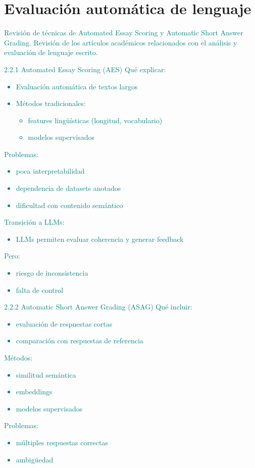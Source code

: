 \section{Evaluación automática de lenguaje}
\textcolor{teal}{Revisión de técnicas de Automated Essay Scoring y Automatic Short Answer Grading. Revisión de los artículos académicos relacionados con el análisis y evaluación de lenguaje escrito.}

\textcolor{teal}{
    2.2.1 Automated Essay Scoring (AES)
    Qué explicar:
    \begin{itemize}
        \item Evaluación automática de textos largos
        \item Métodos tradicionales:
        \begin{itemize}
            \item features lingüísticas (longitud, vocabulario)
            \item modelos supervisados            
        \end{itemize}
    \end{itemize}
    Problemas:
    \begin{itemize}
        \item poca interpretabilidad
        \item dependencia de datasets anotados
        \item dificultad con contenido semántico
    \end{itemize}
    Transición a LLMs:
    \begin{itemize}
        \item LLMs permiten evaluar coherencia y generar feedback
    \end{itemize}
    Pero:
    \begin{itemize}
        \item riesgo de inconsistencia
        \item falta de control
    \end{itemize}
    2.2.2 Automatic Short Answer Grading (ASAG)
    Qué incluir:
    \begin{itemize}
        \item evaluación de respuestas cortas
        \item comparación con respuestas de referencia
    \end{itemize}
    Métodos:
    \begin{itemize}
        \item similitud semántica
        \item embeddings
        \item modelos supervisados
    \end{itemize}
    Problemas:
    \begin{itemize}
        \item múltiples respuestas correctas
        \item ambigüedad
    \end{itemize}
}